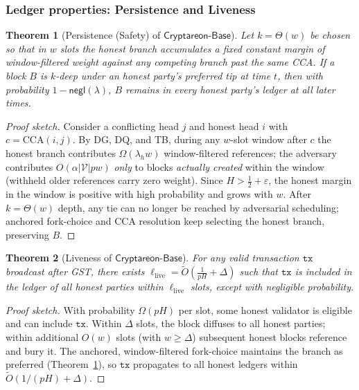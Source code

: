 \documentclass[11pt]{article}
\newtheorem{theorem}{Theorem}[section]
\newcommand{\ProjBase}{\ensuremath{\mathsf{Cryptareon\text{-}Base}}\xspace}
\newcommand{\negl}{\ensuremath{\mathsf{negl}}\xspace}
\newcommand{\Val}{\ensuremath{\mathcal{V}}\xspace}
\newcommand{\tx}{\ensuremath{\mathtt{tx}}\xspace}
\newcommand{\CCA}{\ensuremath{\mathrm{CCA}}\xspace}
\begin{document}
\subsubsection{Ledger properties: Persistence and Liveness}
\begin{theorem}[Persistence (Safety) of \ProjBase]
\label{thm:base-safety}
Let $k=\Theta(w)$ be chosen so that in $w$ slots the honest branch accumulates a fixed constant margin of window-filtered weight against any competing branch past the same CCA. If a block $B$ is $k$-deep under an honest party's preferred tip at time $t$, then with probability $1-\negl(\lambda)$, $B$ remains in every honest party's ledger at all later times.
\end{theorem}
\begin{proof}[Proof sketch]
Consider a conflicting head $j$ and honest head $i$ with $c=\CCA(i,j)$. By DG, DQ, and TB, during any $w$-slot window after $c$ the honest branch contributes $\Omega(\lambda_h w)$ window-filtered references; the adversary contributes $O(\alpha |\Val| p w)$ \emph{only} to blocks \emph{actually created} within the window (withheld older references carry zero weight). Since $H>\tfrac{1}{2}{+}\varepsilon$, the honest margin in the window is positive with high probability and grows with $w$. After $k=\Theta(w)$ depth, any tie can no longer be reached by adversarial scheduling; anchored fork-choice and CCA resolution keep selecting the honest branch, preserving $B$.
\end{proof}

\begin{theorem}[Liveness of \ProjBase]
\label{thm:base-liveness}
For any valid transaction $\tx$ broadcast after GST, there exists $\ell_{\mathrm{live}}=\tilde{O}\!\left( \frac{1}{pH} + \Delta \right)$ such that $\tx$ is included in the ledger of all honest parties within $\ell_{\mathrm{live}}$ slots, except with negligible probability.
\end{theorem}
\begin{proof}[Proof sketch]
With probability $\Omega(pH)$ per slot, some honest validator is eligible and can include $\tx$. Within $\Delta$ slots, the block diffuses to all honest parties; within additional $O(w)$ slots (with $w\ge \Delta$) subsequent honest blocks reference and bury it. The anchored, window-filtered fork-choice maintains the branch as preferred (Theorem~\ref{thm:base-safety}), so $\tx$ propagates to all honest ledgers within $\tilde{O}(1/(pH)+\Delta)$.
\end{proof}
\end{document}
